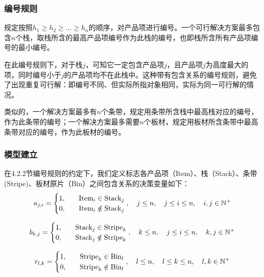 \documentclass[bwprint]{gmcmthesis}
\begin{document}
\subsubsection{编号规则}
规定按照$h_1 \geq h_2 \geq ...\geq h_n$的顺序，对产品项进行编号。一个可行解决方案最多包含$n$个栈，取栈所含的最高产品项编号作为此栈的编号，也即栈所含所有产品项编号的最小编号。

在此编号规则下，对于栈$j$，可知它一定包含产品项$j$，且产品项$j$为高度最大的项，同时编号小于$j$的产品项均不在此栈中。这种带有包含关系的编号规则，避免了出现重复可行解：即编号不同、但实际所指对象相同，实际为同一可行解的情况。

类似的，一个解决方案最多有$n$个条带，规定用条带所含栈中最高栈对应的编号，作为此条带的编号；一个解决方案最多需要$n$个板材，规定用板材所含条带中最高条带对应的编号，作为此板材的编号。


\subsubsection{模型建立}
在4.2.2节编号规则的约定下，我们定义标志各产品项（Item）、栈（Stack）、条带(Stripe)、板材原片（Bin）之间包含关系的决策变量如下：
\begin{equation}   %
    a_{j,i}=
    \begin{cases}
        1, \quad  &  {\rm Item}_i \in   {\rm Stack}_j \\
        0,\quad  &  {\rm Item}_i  \notin   {\rm Stack}_j \\
    \end{cases},\quad j \le n ,\quad j\le i \le n,\quad i,j \in  \mathbb{N}^+  \label{决策变量定义a}
\end{equation}

\begin{equation}
    b_{k,j}=
    \begin{cases}
        1, \quad  &  {\rm Stack}_j \in   {\rm Stripe}_k \\
        0,\quad  &  {\rm Stack}_j  \notin   {\rm Stripe}_k \\
    \end{cases},\quad k \le n ,\quad j\le i \le n,\quad k,j \in  \mathbb{N}^+ \label{决策变量定义b}
\end{equation}

\begin{equation}
    r_{l,k}=
    \begin{cases}
        1, \quad  &  {\rm Stripe}_k \in   {\rm Bin}_l \\
        0,\quad  &  {\rm Stripe}_k  \notin   {\rm Bin}_l \\
    \end{cases},\quad l \le n ,\quad l \le k \le n,\quad l,k \in  \mathbb{N}^+ \label{决策变量定义r}
\end{equation}
\end{document}

